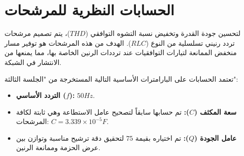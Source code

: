
\section{الحسابات النظرية للمرشحات} \label{sec:sec3}
  \thispagestyle{empty} %
  {\fontsize{16}{27}\selectfont
  لتحسين جودة القدرة وتخفيض نسبة التشوه التوافقي ($THD$)، يتم تصميم مرشحات تردد رنيني  تسلسلية من النوع ($RLC$). الهدف من هذه المرشحات هو توفير مسار منخفض الممانعة لتيارات التوافقيات عند ترددات الرنين الخاصة بها، مما يمنعها من الانتشار في الشبكة.
  \par}
 \vspace{5pt} 
{\sloppy
\noindent تعتمد الحسابات على البارامترات الأساسية التالية المستخرجة من "الجلسة الثالثة":}
\begin{itemize}
    \item \textbf{التردد الأساسي ($f$):} $50 Hz$.
    \item \textbf{سعة المكثف ($C$):} تم حسابها سابقاً لتصحيح عامل الاستطاعة وهي ثابتة لكافة المرشحات: $C = 3.339 \times 10^{-5} F$.
    \item \textbf{عامل الجودة ($Q$):} تم اختياره بقيمة $75$ لتحقيق دقة ترشيح مناسبة وتوازن بين عرض الحزمة وممانعة الرنين.
\end{itemize}






